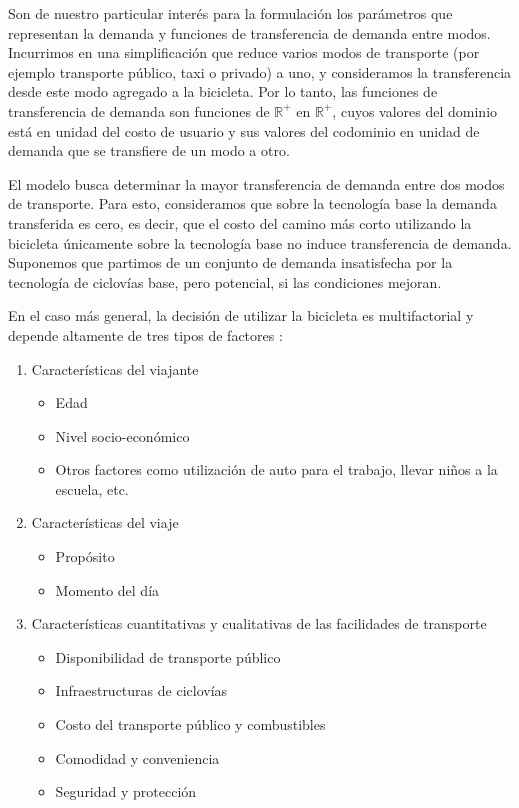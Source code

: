 
Son de nuestro particular interés para la formulación los parámetros que representan la demanda y funciones de transferencia de demanda entre modos. Incurrimos en una simplificación que reduce varios modos de transporte (por ejemplo transporte público, taxi o privado) a uno, y consideramos la transferencia desde este modo agregado a la bicicleta. Por lo tanto, las funciones de transferencia de demanda son funciones de $\mathbb{R}^+$ en $\mathbb{R}^+$, cuyos valores del dominio está en unidad del costo de usuario y sus valores del codominio en unidad de demanda que se transfiere de un modo a otro.

El modelo busca determinar la mayor transferencia de demanda entre dos modos de transporte. Para esto, consideramos que sobre la tecnología base la demanda transferida es cero, es decir, que el costo del camino más corto utilizando la bicicleta únicamente sobre la tecnología base no induce transferencia de demanda. Suponemos que partimos de un conjunto de demanda insatisfecha por la tecnología de ciclovías base, pero potencial, si las condiciones mejoran.

En el caso más general, la decisión de utilizar la bicicleta es multifactorial y depende altamente de tres tipos de factores \parencite{ortuz2011}:

\begin{enumerate}
  \item{
      Características del viajante
        \begin{itemize}
          \item{Edad}
          \item{Nivel socio-económico}
          \item{Otros factores como utilización de auto para el trabajo, llevar niños a la escuela, etc.}
        \end{itemize}
  }
  \item{
      Características del viaje
        \begin{itemize}
          \item{Propósito}
          \item{Momento del día}
        \end{itemize}
  }
\item{\label{bicycleusagefactors}
      Características cuantitativas y cualitativas de las facilidades de transporte
      \begin{itemize}
          \item{Disponibilidad de transporte público}
          \item{Infraestructuras de ciclovías}
          \item{Costo del transporte público y combustibles}
          \item{Comodidad y conveniencia}
          \item{Seguridad y protección}
      \end{itemize}
  }
\end{enumerate}

